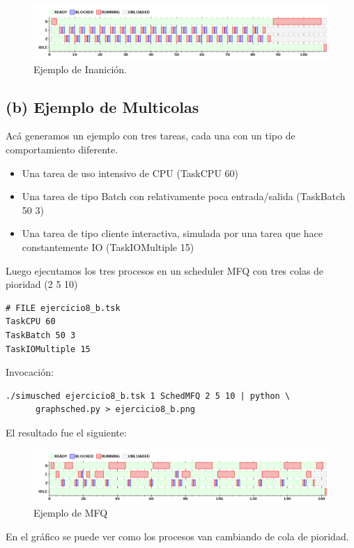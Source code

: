 \begin{figure}[H]
  \centering
    \includegraphics[width=1\textwidth]{img/ejercicio8_a.png}
    \caption{Ejemplo de Inanici\'on.}
\end{figure}

\subsection{(b) Ejemplo de Multicolas}

Ac\'a generamos un ejemplo con tres tareas, cada una con un tipo de comportamiento diferente.

\begin{itemize}
 \item Una tarea de uso intensivo de CPU (TaskCPU 60)
 \item Una tarea de tipo Batch con relativamente poca entrada/salida (TaskBatch 50 3)
 \item Una tarea de tipo cliente interactiva, simulada por una tarea que hace constantemente IO (TaskIOMultiple 15)
\end{itemize}

Luego ejecutamos los tres procesos en un scheduler MFQ con tres colas de pioridad (2 5 10)

\begin{framed}
\begin{verbatim}
# FILE ejercicio8_b.tsk
TaskCPU 60
TaskBatch 50 3
TaskIOMultiple 15
\end{verbatim}
\end{framed}

Invocaci\'on:

\begin{framed}
\begin{verbatim}
./simusched ejercicio8_b.tsk 1 SchedMFQ 2 5 10 | python \
      graphsched.py > ejercicio8_b.png
\end{verbatim}
\end{framed}

El resultado fue el siguiente:

\begin{figure}[H]
  \centering
    \includegraphics[width=1\textwidth]{img/ejercicio8_b.png}
    \caption{Ejemplo de MFQ}
\end{figure}

En el gr\'afico se puede ver como los procesos van cambiando de cola de pioridad.
